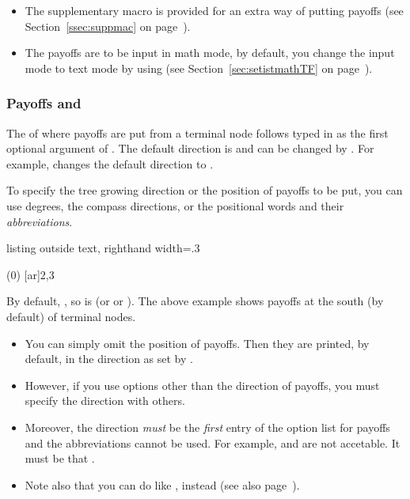 \remark 
\begin{itemize}\tightlist
\item
The supplementary macro \cmd{\xtPayoff} is provided for an extra way of putting payoffs (see Section~\ref{ssec:suppmac} on page~\pageref{ssec:suppmac}).
\item
The payoffs are to be input in math mode, by default, you change the input mode to text mode by using \cmd{\setistmathTF(*)} (see Section~\ref{sec:setistmathTF} on page~\pageref{sec:setistmathTF}).
\end{itemize}

\subsubsection{Payoffs and \protect{}}
\label{sec:payoffdirection}

The  of where payoffs are put from a terminal node follows \icmd{\istgrowdirection} typed in as the first optional argument of \cmd{\istroot}.
The default direction is  and can be changed by \cmd{\setistgrowdirection}.
For example,  changes the default direction to .

To specify the tree growing direction or the position of payoffs to be put, you can use degrees, the compass directions, or the positional words and their \emph{abbreviations}.

\begin{tcblisting}{listing outside text, righthand width=.3\linewidth}
\begin{istgame}
\istroot(0)
  [ar]{2,3}
  \endist
\end{istgame}
\end{tcblisting}

By default, , so \cmd{\istgrowdirection} is  (or  or ).
The above example shows payoffs at the south (by default) of terminal nodes.

\remark
  \begin{itemize}\tightlist
  \item 
  You can simply omit the position of payoffs. Then they are printed, by default, in the direction as set by \cmd{\istgrowdirection}.
  \item 
  However, if you use options other than the direction of payoffs, you must specify the direction with others.
  \item
  Moreover, the direction \emph{must} be the \emph{first} entry of the option list for payoffs and the abbreviations cannot be used.
  For example, \xw{[b,yshift=-3mm]} and \xw{[yshift=-3mm,below]} are not accetable. 
  It must be that \xw{[below,yshift=-3mm]}.
  \item Note also that you can do like \xw{[[yshift=-3mm]below}, instead (see also page~\pageref{page:finetuningpayoffs}).
  \end{itemize}

